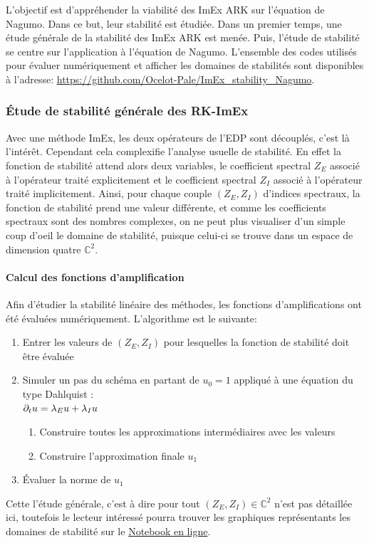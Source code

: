 L'objectif est d'appréhender la viabilité des ImEx ARK sur l'équation de Nagumo. Dans ce but, leur stabilité est étudiée.
Dans un premier temps, une étude générale de la stabilité des ImEx ARK est menée.
Puis, l'étude de stabilité se centre sur l'application à l'équation de Nagumo. L'ensemble des codes utilisés pour évaluer numériquement et afficher les domaines de stabilités
sont disponibles à l'adresse: \href{https://github.com/Ocelot-Pale/ImEx_stability_Nagumo}{https://github.com/Ocelot-Pale/ImEx\_stability\_Nagumo}.



\subsubsection{Étude de stabilité générale des RK-ImEx}
    Avec une méthode ImEx, les deux opérateurs de l'EDP sont découplés, c'est là l'intérêt.
    Cependant cela complexifie l'analyse usuelle de stabilité. 
    En effet la fonction de stabilité attend alors deux variables, 
    le coefficient spectral $Z_E$ associé à l'opérateur traité explicitement et
    le coefficient spectral $Z_I$ associé à l'opérateur traité implicitement.
    Ainsi, pour chaque couple $(Z_E,Z_I)$ d'indices spectraux, la fonction de stabilité prend une valeur différente, et comme les coefficients spectraux sont des nombres complexes, 
    on ne peut plus visualiser d'un simple coup d'oeil le domaine de stabilité, puisque celui-ci se trouve dans un espace de dimension quatre $\mathbb{C}^2$.
    \paragraph{Calcul des fonctions d'amplification }
    Afin d'étudier la stabilité linéaire des méthodes, les fonctions d'amplifications ont été évaluées numériquement.
    L'algorithme est le suivante:
    \begin{enumerate}
        \item Entrer les valeurs de $(Z_E,Z_I)$ pour lesquelles la fonction de stabilité doit être évaluée
        \item Simuler un pas du schéma en partant de $u_0 = 1$ appliqué à une équation du type Dahlquist :\\$\partial_t u = \lambda_E u + \lambda_I u$
        \begin{enumerate}
            \item Construire toutes les approximations intermédiaires avec les valeurs 
            \item Construire l'approximation finale $u_1$
        \end{enumerate}
        \item Évaluer la norme de $u_1$
    \end{enumerate}
    Cette l'étude générale, c'est à dire pour tout $(Z_E,Z_I) \in \mathbb{C}^2$ n'est pas détaillée ici, toutefois
    le lecteur intéressé pourra trouver les graphiques représentants les domaines de stabilité sur le \href{https://github.com/Ocelot-Pale/ImEx_stability_Nagumo}{Notebook en ligne}.


